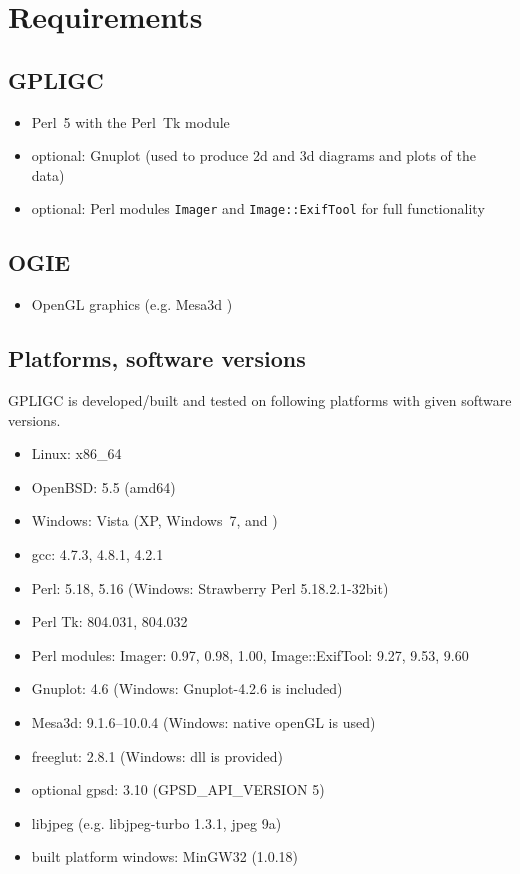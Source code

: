 \section{Requirements}
\label{requirements}

\subsection*{GPLIGC}

\begin{itemize}
\item Perl~5 with the Perl~Tk module \cite{perl,perltk}
\item {\scriptsize optional:} Gnuplot \cite{gnuplot} (used to produce 2d and 3d diagrams and plots of the data)
\item {\scriptsize optional:} Perl modules \texttt{Imager} \cite{imager} and \texttt{Image::ExifTool} \cite{exiftool} for full functionality
\end{itemize}


\subsection*{OGIE}

\begin{itemize}
\item OpenGL graphics (e.g. Mesa3d \cite{mesa})
\end{itemize}


\subsection*{Platforms, software versions}
GPLIGC is developed/built and tested on following platforms with given software versions.

\begin{itemize}
\item Linux: x86\_64
\item OpenBSD: 5.5 (amd64)
\item Windows: Vista (XP, Windows~7, and )
\item gcc: 4.7.3, %
4.8.1, %
4.2.1 %
\item Perl: 5.18, %
5.16 %
(Windows: Strawberry Perl 5.18.2.1-32bit)
\item Perl Tk: 804.031, 804.032
\item Perl modules: Imager: 0.97, 0.98, 1.00, %
Image::ExifTool: 9.27, 9.53, 9.60
\item Gnuplot: 4.6 (Windows: Gnuplot-4.2.6 is included)
\item Mesa3d: 9.1.6--10.0.4 (Windows: native openGL is used)
\item freeglut: 2.8.1 (Windows: dll is provided)
\item {\scriptsize optional} gpsd: 3.10 (GPSD\_API\_VERSION 5)
\item libjpeg (e.g. libjpeg-turbo 1.3.1, jpeg 9a)
\item built platform windows: MinGW32 (1.0.18)
\end{itemize}


